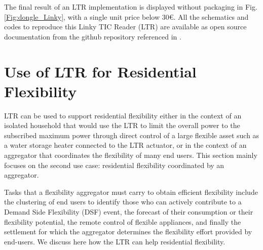 \documentclass[conference]{IEEEtran}
\begin{document}
The final result of an LTR implementation is displayed without packaging in Fig. \ref{Fig:dongle_Linky}, with a single unit price below 30€. All the schematics and codes to reproduce this Linky TIC Reader (LTR) are  available as open source documentation from the github repository referenced in \cite{github:LTR}.





\section{Use of LTR for Residential Flexibility}
\label{section:experiments}


LTR can be used to support residential flexibility either in the context of an isolated household that would use the LTR to limit the overall power to the subscribed maximum power through direct control of a large flexible asset such as a water storage heater connected to the LTR actuator, or in the context of an aggregator that coordinates the flexibility of many end users. This section mainly focuses on the second use case: residential flexibility coordinated by an aggregator. %

Tasks that a flexibility aggregator must carry to obtain efficient flexibility include the clustering of end users to identify those who can actively contribute to a Demand Side Flexibility (DSF) event, the forecast of their consumption or their flexibility potential, the remote control of flexible appliances, and finally the settlement for which the aggregator determines the flexibility effort provided by end-users. We discuss here how the LTR can help residential flexibility.
\end{document}

